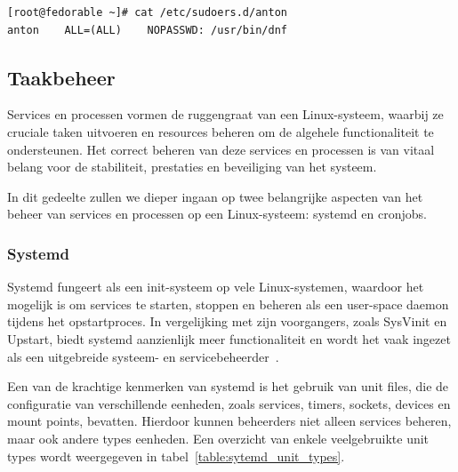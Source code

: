 \begin{listing}
  \begin{verbatim}
[root@fedorable ~]# cat /etc/sudoers.d/anton
anton    ALL=(ALL)    NOPASSWD: /usr/bin/dnf
  \end{verbatim}
    \caption[Inhoud van \texttt{/etc/sudoers.d/anton}.]{Uitvoer van het \texttt{cat}-commando dat de inhoud van het bestand \texttt{/etc/sudoers.d/anton} laat zien. Hieruit blijkt dat de gebruiker \texttt{anton} root-privileges heeft voor het uitvoeren van het \texttt{dnf}-commando en geen wachtwoord hoeft in te voeren bij dit commando.}
  \label{lst:linux-sudoers}
\end{listing}

\subsection{Taakbeheer}
\label{linux_taakbeheer}

Services en processen vormen de ruggengraat van een Linux-systeem, waarbij ze cruciale taken uitvoeren en resources beheren om de algehele functionaliteit te ondersteunen.
Het correct beheren van deze services en processen is van vitaal belang voor de stabiliteit, prestaties en beveiliging van het systeem.

In dit gedeelte zullen we dieper ingaan op twee belangrijke aspecten van het beheer van services en processen op een Linux-systeem: systemd en cronjobs.

\subsubsection{Systemd}
\label{linux_systemd}

Systemd fungeert als een init-systeem op vele Linux-systemen, waardoor het mogelijk is om services te starten, stoppen en beheren als een user-space daemon tijdens het opstartproces.
In vergelijking met zijn voorgangers, zoals SysVinit en Upstart, biedt systemd aanzienlijk meer functionaliteit en wordt het vaak ingezet als een uitgebreide systeem- en servicebeheerder~\autocite{ward2021linux}.

Een van de krachtige kenmerken van systemd is het gebruik van unit files, die de configuratie van verschillende eenheden, zoals services, timers, sockets, devices en mount points, bevatten.
Hierdoor kunnen beheerders niet alleen services beheren, maar ook andere types eenheden.
Een overzicht van enkele veelgebruikte unit types wordt weergegeven in tabel~\ref{table:sytemd_unit_types}.

